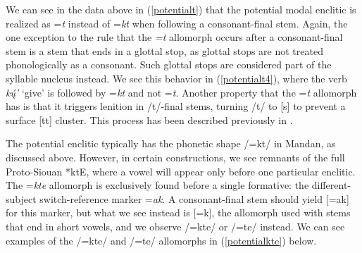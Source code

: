 We can see in the data above in (\ref{potentialt}) that the potential modal enclitic is realized as =\textit{t} instead of =\textit{kt} when following a consonant-final stem. Again, the one exception to the rule that the \textit{=t} allomorph occurs after a consonant-final stem is a stem that ends in a glottal stop, as glottal stops are not treated phonologically as a consonant. Such glottal stops are considered part of the syllable nucleus instead. We see this behavior in (\ref{potentialt4}), where the verb \textit{kų́'} `give' is followed by =\textit{kt} and not =\textit{t}. Another property that the =\textit{t} allomorph has is that it triggers lenition in /t/-final stems, turning /t/ to [s] to prevent a surface [tt] cluster. This process has been described previously in .


The potential enclitic typically has the phonetic shape /=kt/ in Mandan, as discussed above. However, in certain constructions, we see remnants of the full Proto-Siouan *ktE, where a vowel will appear only before one particular enclitic. The =\textit{kte} allomorph is exclusively found before a single formative: the different-subject switch-reference marker =\textit{ak}. A consonant-final stem should yield [=ak] for this marker, but what we see instead is [=k], the allomorph used with stems that end in short vowels, and we observe /=kte/ or /=te/ instead. We can see examples of the /=kte/ and /=te/ allomorphs in (\ref{potentialkte}) below.



